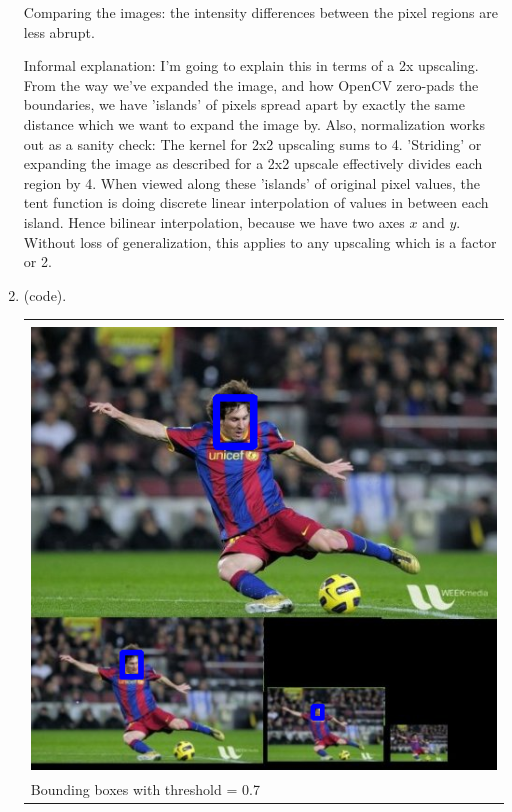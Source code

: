 \documentclass{article}
\begin{document}
\begin{enumerate}[label=(\roman*)]
Comparing the images: the intensity differences between the pixel regions are less abrupt.

Informal explanation: I'm going to explain this in terms of a 2x upscaling. From the way we've expanded the image, and how OpenCV zero-pads the boundaries, we have 'islands' of pixels spread apart by exactly the same distance which we want to expand the image by. Also, normalization works out as a sanity check: The kernel for 2x2 upscaling sums to 4. 'Striding' or expanding the image as described for a 2x2 upscale effectively divides each region by 4. When viewed along these 'islands' of original pixel values, the tent function is doing discrete linear interpolation of values in between each island. Hence bilinear interpolation, because we have two axes $x$ and $y$. Without loss of generalization, this applies to any upscaling which is a factor or 2.

\item %
(code).

\begin{tabular}[t]{l}
	\hline \\
	\includegraphics[width=1.0\textwidth]{img/image_detections.png} \\
	Bounding boxes with threshold = 0.7 \\
	\hline
\end{tabular}

\pagebreak


\end{enumerate}
\end{document}
